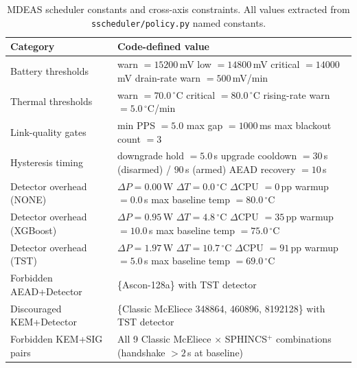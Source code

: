 \documentclass[10pt,twocolumn]{article}
\begin{document}
\begin{table}[!ht]
\centering
\caption{MDEAS scheduler constants and cross-axis constraints.
All values extracted from \texttt{sscheduler/policy.py} named constants.}
\label{tab:scheduler-thresholds}
\footnotesize
\setlength{\tabcolsep}{4pt}
\begin{tabular}{@{}p{3.2cm}p{13.8cm}@{}}
\toprule
{Category} & {Code-defined value} \\
\midrule
Battery thresholds
  & warn $= 15200$\,mV \quad low $= 14800$\,mV \quad critical $= 14000$\,mV \quad drain-rate warn $= 500$\,mV/min \\
Thermal thresholds
  & warn $= 70.0\,^{\circ}$C \quad critical $= 80.0\,^{\circ}$C \quad rising-rate warn $= 5.0\,^{\circ}$C/min \\
Link-quality gates
  & min PPS $= 5.0$ \quad max gap $= 1000$\,ms \quad max blackout count $= 3$ \\
Hysteresis timing
  & downgrade hold $= 5.0$\,s \quad upgrade cooldown $= 30$\,s (disarmed) / $90$\,s (armed) \quad AEAD recovery $= 10$\,s \\
\midrule
Detector overhead (NONE)
  & $\Delta P = 0.00$\,W \quad $\Delta T = 0.0\,^{\circ}$C \quad $\Delta$CPU $= 0$\,pp \quad warmup $= 0.0$\,s \quad max baseline temp $= 80.0\,^{\circ}$C \\
Detector overhead (XGBoost)
  & $\Delta P = 0.95$\,W \quad $\Delta T = 4.8\,^{\circ}$C \quad $\Delta$CPU $= 35$\,pp \quad warmup $= 10.0$\,s \quad max baseline temp $= 75.0\,^{\circ}$C \\
Detector overhead (TST)
  & $\Delta P = 1.97$\,W \quad $\Delta T = 10.7\,^{\circ}$C \quad $\Delta$CPU $= 91$\,pp \quad warmup $= 5.0$\,s \quad max baseline temp $= 69.0\,^{\circ}$C \\
\midrule
Forbidden AEAD+Detector
  & \{Ascon-128a\} with TST detector \\
Discouraged KEM+Detector
  & \{Classic McEliece 348864, 460896, 8192128\} with TST detector \\
Forbidden KEM+SIG pairs
  & All 9 Classic McEliece $\times$ SPHINCS$^+$ combinations (handshake $> 2$\,s at baseline) \\
\bottomrule
\end{tabular}
\end{table}
\end{document}
